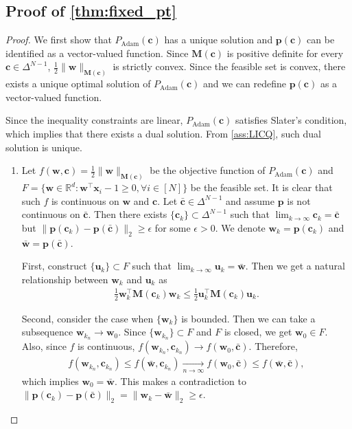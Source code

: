 \documentclass{article} %
\theoremstyle{plain}
\theoremstyle{definition}
\theoremstyle{remark}
\newcommand{\R}{\mathbb{R}}
\def\bx{{\mathbf x}}
\def\bc{{\mathbf c}}
\def\bp{{\mathbf p}}
\def\bw{{\mathbf w}}
\def\bM{{\mathbf M}}
\begin{document}
\subsection[Proof of Theorem \ref{thm:fixed_pt}]{Proof of \cref{thm:fixed_pt}}
\fixedpt*
\begin{proof}
    We first show that $P_{\text{Adam}}(\bc)$ has a unique solution and $\bp(\bc)$ can be identified as a vector-valued function. Since $\bM(\bc)$ is positive definite for every $\bc \in \Delta^{N-1}$, $\frac{1}{2}\|\bw\|_{\bM(\bc)}$ is strictly convex. Since the feasible set is convex, there exists a unique optimal solution of $P_{\text{Adam}}(\bc)$ and we can redefine $\bp(\bc)$ as a vector-valued function.

    Since the inequality constraints are linear, $P_{\text{Adam}}(\bc)$ satisfies Slater's condition, which implies that there exists a dual solution. From \cref{ass:LICQ}, such dual solution is unique.

    \begin{enumerate}[label=(\alph*)]
        \item Let $f(\bw, \bc)=\frac{1}{2}\|\bw\|_{\bM(\bc)}$ be the objective function of $P_{\text{Adam}}(\bc)$ and $F=\{\bw\in\R^d :\bw^\top\bx_i -1 \geq 0, \forall i\in[N]\}$ be the feasible set. It is clear that such $f$ is continuous on $\bw$ and $\bc$. Let $\bar{\bc} \in \Delta^{N-1}$ and assume $\bp$ is not continuous on $\bar{\bc}$. Then there exists $\{\mathbf{c}_k\} \subset \Delta^{N-1}$ such that $\lim_{k \rightarrow \infty} \mathbf{c}_k = \bar{\mathbf{c}}$ but $\|\bp(\mathbf{c}_{k}) - \bp(\bar{\mathbf{c}})\|_2 \geq \epsilon$ for some $\epsilon > 0$. We denote $\mathbf{w}_k = \bp(\mathbf{c}_k)$ and $\bar{\mathbf{w}} = \bp(\bar{\mathbf{c}})$.

    First, construct $\{\mathbf{u}_k\} \subset F$ such that $\lim_{k \rightarrow \infty} \mathbf{u}_k = \bar{\mathbf{w}}$. Then we get a natural relationship between $\bw_k$ and $\mathbf{u}_k$ as
    \begin{align*}
        \frac{1}{2} \mathbf{w}_k^\top \bM(\mathbf{c}_k)\mathbf{w}_k \leq \frac{1}{2}\mathbf{u}_k^\top \bM(\mathbf{c}_k)\mathbf{u}_k.
    \end{align*}
    
    Second, consider the case when $\{\mathbf{w}_k\}$ is bounded. Then we can take a subsequence $\mathbf{w}_{k_n} \rightarrow \mathbf{w}_0$. Since $\{\mathbf{w}_{k_n}\} \subset F$ and $F$ is closed, we get $\mathbf{w}_0 \in F$. Also, since $f$ is continuous, $f(\mathbf{w}_{k_n}, \mathbf{c}_{k_n}) \rightarrow f(\mathbf{w}_0, \bar{\mathbf{c}})$. Therefore,
    \begin{align*}
        f(\mathbf{w}_{k_n}, \mathbf{c}_{k_n}) \leq f(\bar{\mathbf{w}}, \mathbf{c}_{k_n}) \xrightarrow[n \rightarrow \infty]{}
        f(\mathbf{w}_0, \bar{\mathbf{c}}) \leq f(\bar{\mathbf{w}}, \bar{\mathbf{c}}),
    \end{align*}
    which implies $\mathbf{w}_0 = \bar{\mathbf{w}}$. This makes a contradiction to $\|\bp(\mathbf{c}_{k}) - \bp(\bar{\mathbf{c}})\|_2 = \|\mathbf{w}_k - \bar{\mathbf{w}}\|_2\geq \epsilon$.


\end{enumerate}
\end{proof}
\end{document}
